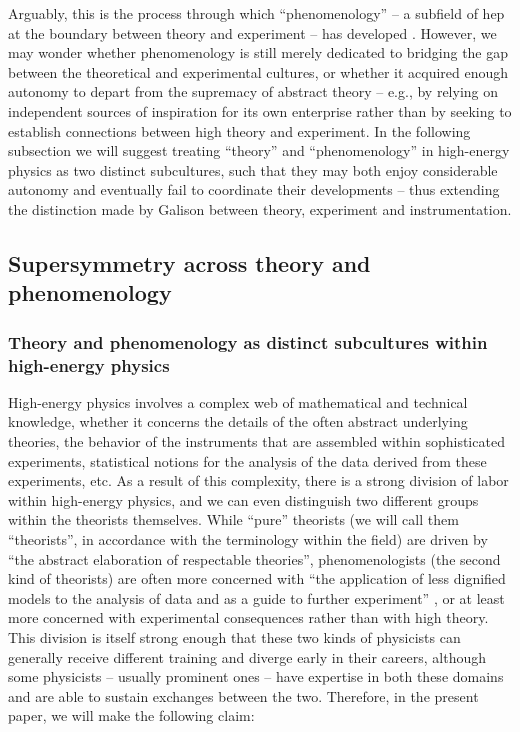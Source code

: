 \documentclass[smallextended]{svjour3}
\begin{document}
Arguably, this is the process through which ``phenomenology'' -- a subfield of \gls{hep} at the boundary between theory and experiment -- has developed \citep[p.~837]{galison1997image}. However, we may wonder whether phenomenology is still merely dedicated to bridging the gap between the theoretical and experimental cultures, or whether it acquired enough autonomy to depart from the supremacy of abstract theory -- e.g., by relying on independent sources of inspiration for its own enterprise rather than by seeking to establish connections between high theory and experiment. In the following subsection we will suggest treating ``theory'' and ``phenomenology'' in high-energy physics as two distinct subcultures, such that they may both enjoy considerable autonomy and eventually fail to coordinate their developments -- thus extending the distinction made by Galison between theory, experiment and instrumentation.

\subsection{Supersymmetry across theory and phenomenology}
\label{section:hep_susy}

\subsubsection{Theory and phenomenology as distinct subcultures within high-energy physics}

High-energy physics involves a complex web of mathematical and technical knowledge, whether it concerns the details of the often abstract underlying theories, the behavior of the instruments that are assembled within sophisticated experiments, statistical notions for the analysis of the data derived from these experiments, etc. As a result of this complexity, there is a strong division of labor within high-energy physics, and we can even distinguish two different groups within the theorists themselves.  While ``pure'' theorists (we will call them ``theorists'', in accordance with the terminology within the field) are driven by ``the abstract elaboration of respectable theories'', phenomenologists (the second kind of theorists) are often more concerned with ``the application of less dignified models to the analysis of data and as a
guide to further experiment'' \citep{pickering1984constructing}, or at least more concerned with experimental consequences rather than with high theory. This division is itself strong enough that these two kinds of physicists can generally receive different training and diverge early in their careers, although some physicists -- usually prominent ones -- have expertise in both these domains and are able to sustain exchanges between the two. Therefore, in the present paper, we will make the following claim:
\end{document}
